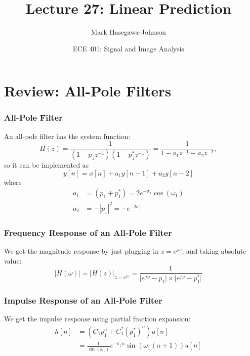 \documentclass{beamer}
\title{Lecture 27: Linear Prediction}
\author{Mark Hasegawa-Johnson}
\date{ECE 401: Signal and Image Analysis}
\begin{document}
\begin{frame}
  \maketitle
\end{frame}

\begin{frame}
  \tableofcontents
\end{frame}

\section[Review]{Review: All-Pole Filters}
\setcounter{subsection}{1}

\begin{frame}
  \frametitle{All-Pole Filter}

  An all-pole filter has the system function:
  \begin{displaymath}
  H(z) = \frac{1}{(1-p_1z^{-1})(1-p_1^*z^{-1})}= \frac{1}{1-a_1z^{-1}-a_2z^{-2}},
  \end{displaymath}
  so it can be implemented as
  \begin{displaymath}
    y[n] = x[n] + a_1y[n-1] + a_2y[n-2]
  \end{displaymath}
  where
  \begin{align*}
    a_1 &= (p_1+p_1^*) = 2e^{-\sigma_1}\cos(\omega_1)\\
    a_2 &= -|p_1|^2 = -e^{-2\sigma_1}
  \end{align*}
\end{frame}

\begin{frame}
  \frametitle{Frequency Response of an All-Pole Filter}

  We get the magnitude response by just plugging in $z=e^{j\omega}$,
  and taking absolute value:
  \begin{displaymath}
    |H(\omega)| = \lvert H(z)\rvert_{z=e^{j\omega}} = \frac{1}{\lvert e^{j\omega}-p_1\rvert\times\lvert e^{j\omega}-p_1^*\rvert}
  \end{displaymath}
  \centerline{}
\end{frame}

\begin{frame}
  \frametitle{Impulse Response of an All-Pole Filter}

  We get the impulse response using partial fraction expansion:
  \begin{align*}
    h[n] &= \left(C_1p_1^n + C_1^* (p_1^*)^n\right) u[n]\\
    &=\frac{1}{\sin(\omega_1)} e^{-\sigma_1n}\sin\left(\omega_1(n+1)\right)u[n]
  \end{align*}
  \centerline{}
\end{frame}
\end{document}
